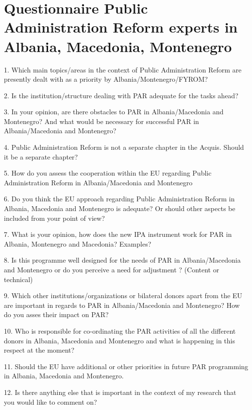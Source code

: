 
\chapter[Questionnaire  Public Administration Reform experts]{Questionnaire Public Administration Reform experts in Albania, Macedonia, Montenegro}
\label{anhang:Questionnaire Public Administration Reform experts}
1. Which main topics/areas in the context of Public Administration Reform are presently dealt with as a priority by Albania/Montenegro/FYROM?

2. Is the institution/structure dealing with PAR adequate for the tasks ahead? 

3. In your opinion, are there obstacles to PAR in Albania/Macedonia and Montenegro? And what would be necessary for successful PAR in Albania/Macedonia and Montenegro? 

4. Public Administration Reform is not a separate chapter in the Acquis. Should it be a separate chapter? 

5. How do you assess the cooperation within the EU regarding Public Administration Reform in Albania/Macedonia and Montenegro 

6. Do you think the EU approach regarding Public Administration Reform in Albania, Macedonia and Montenegro is adequate? Or should other aspects be included from your point of view?

7. What is your opinion, how does the new IPA instrument work for PAR in Albania, Montenegro and Macedonia? Examples?

8. Is this programme well designed for the needs of PAR in Albania/Macedonia and Montenegro or do you perceive a need for adjustment ? (Content or technical)

9. Which other institutions/organizations or bilateral donors apart from the EU are important in regards to PAR in Albania/Macedonia and Montenegro? How do you asses their impact on PAR? 

10. Who is responsible for co-ordinating the PAR activities of all the different donors in Albania, Macedonia and Montenegro and what is happening in this respect at the moment? 

11. Should the EU have additional or other priorities in future PAR programming in Albania, Macedonia and Montenegro. 

12. Is there anything else that is important in the context of my research that you would like to comment on?